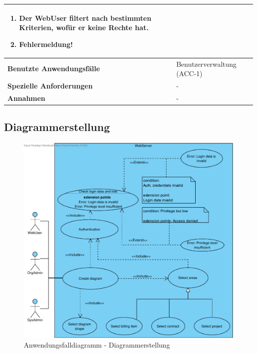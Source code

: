 \begin{longtable}[c]{|p{4cm}|p{10cm}|}
\begin{enumerate}
        \item Der WebUser filtert nach bestimmten Kriterien, wofür er keine Rechte hat.
        \item Fehlermeldung!
    \end{enumerate}                                                                                                                               \\ \hline
    \textbf{Benutzte Anwendungsfälle}      & Benutzerverwaltung (ACC-1)                                                                                      \\ \hline
    \textbf{Spezielle Anforderungen}       & -                                                                                                               \\ \hline
    \textbf{Annahmen}                      & -                                                                                                               \\ \hline
\end{longtable}

\clearpage

\subsection{Diagrammerstellung}

\begin{figure}[h]
    \centering
    \includegraphics[width=\linewidth]{img/diagrams/Create_Custom_Diagram.pdf}
    \caption{Anwendungsfalldiagramm - Diagrammerstellung}
    \label{fig:anwendungsfalldiagramm-dia-erstellung}
\end{figure}

